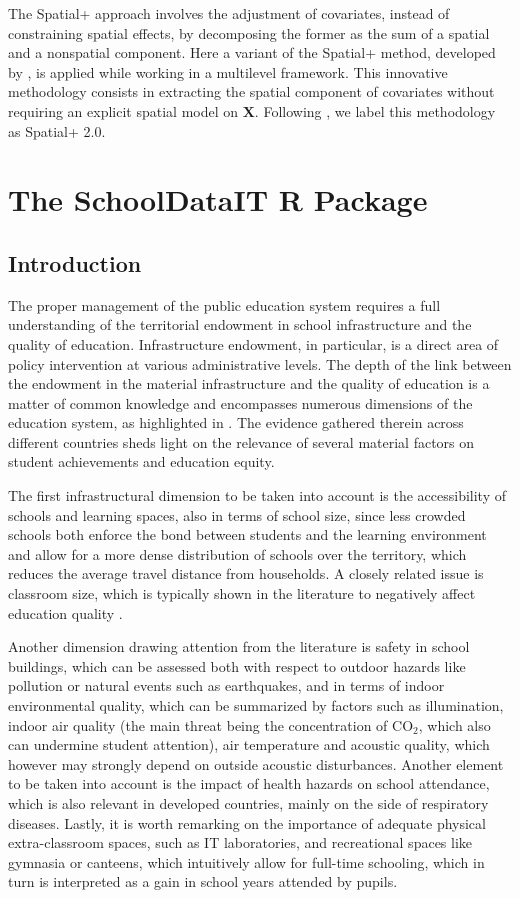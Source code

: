 \documentclass{book}
\begin{document}
The Spatial+ approach \citep{Dupont} involves the adjustment of covariates, instead of constraining spatial effects, by decomposing the former as the sum of a spatial and a nonspatial component. Here a variant of the Spatial+ method, developed by \cite{Urdangarin24}, is applied while working in a multilevel framework. This innovative methodology consists in extracting the spatial component of covariates without requiring an explicit spatial model on $\mathbf{X}$. Following \cite{Lamouroux}, we label this methodology as Spatial+ 2.0. 



\chapter{The SchoolDataIT R Package}

\section{Introduction}

The proper management of the public education system requires a full understanding of the territorial endowment in school infrastructure and the quality of education. Infrastructure endowment, in particular, is a direct area of policy intervention at various administrative levels. The depth of the link between the endowment in the material infrastructure and the quality of education is a matter of common knowledge and encompasses numerous dimensions of the education system, as highlighted in \cite{WB}. The evidence gathered therein across different countries sheds light on the relevance of several material factors on student achievements and education equity.

The first infrastructural dimension to be taken into account is the accessibility of schools and learning spaces, also in terms of school size, since less crowded schools both enforce the bond between students and the learning environment and allow for a more dense distribution of schools over the territory, which reduces the average travel distance from households. A closely related issue is classroom size, which is typically shown in the literature to negatively affect education quality \citep{WB}.

Another dimension drawing attention from the literature is safety in school buildings, which can be assessed both with respect to outdoor hazards like pollution or natural events such as earthquakes, and in terms of indoor environmental quality, which can be summarized by factors such as illumination, indoor air quality (the main threat being the concentration of $\mathrm{CO_{2}}$, which also can undermine student attention), air temperature and acoustic quality, which however may strongly depend on outside acoustic disturbances. Another element to be taken into account is the impact of health hazards on school attendance, which is also relevant in developed countries, mainly on the side of respiratory diseases. Lastly, it is worth remarking on the importance of adequate physical extra-classroom spaces, such as IT laboratories, and recreational spaces like gymnasia or canteens, which intuitively allow for full-time schooling, which in turn is interpreted as a gain in school years attended by pupils.
\end{document}
